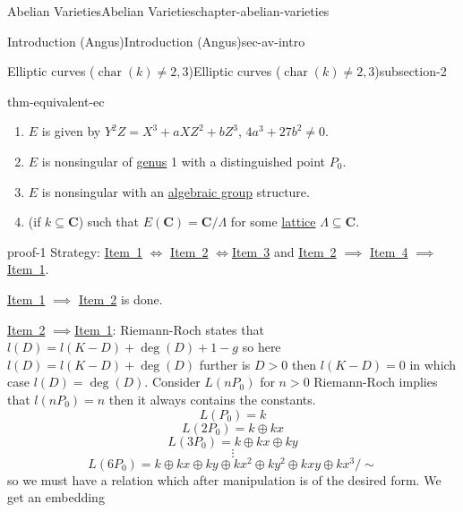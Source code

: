 \documentclass[oneside,10pt,]{book}
\numberwithin{equation}{section}
\newcommand{\CC}{\mathbf{C}}
\DeclareMathOperator{\characteristic}{char}
\newcommand{\gt}{>}
\begin{document}
\begin{chapterptx}{Abelian Varieties}{}{Abelian Varieties}{}{}{chapter-abelian-varieties}
\begin{sectionptx}{Introduction (Angus)}{}{Introduction (Angus)}{}{}{sec-av-intro}
\begin{subsectionptx}{Elliptic curves (\(\characteristic(k) \ne 2,3\))}{}{Elliptic curves (\(\characteristic(k) \ne 2,3\))}{}{}{subsection-2}
\begin{theorem}{}{}{thm-equivalent-ec}
\begin{enumerate}
\item\hypertarget{item-cubic-eq}{}\(E\) is given by \(Y^2Z = X^3 + aXZ^2 + bZ^3\), \(4a^3 + 27b^2 \ne 0\).%
\item\hypertarget{item-nonsing-pt}{}\(E\) is nonsingular of \hyperref[def-class-set]{genus} 1 with a distinguished point \(P_0\).%
\item\hypertarget{item-nonsing-gp}{}\(E\) is nonsingular with an \hyperref[def-alg-gp]{algebraic group} structure.%
\item\hypertarget{item-cmplx}{}(if \(k \subseteq \CC\)) such that \(E(\CC) = \CC/\Lambda\) for some \hyperref[def-buntes-lattice]{lattice} \(\Lambda \subseteq \CC\).%
\end{enumerate}
%
\end{theorem}
\begin{proofptx}{}{proof-1}
\hypertarget{p-14}{}%
Strategy: \hyperlink{item-cubic-eq}{Item~1} \(\iff\) \hyperlink{item-nonsing-pt}{Item~2} \(\iff\)\hyperlink{item-nonsing-gp}{Item~3} and \hyperlink{item-nonsing-pt}{Item~2} \(\implies\) \hyperlink{item-cmplx}{Item~4} \(\implies\) \hyperlink{item-cubic-eq}{Item~1}.%
\par
\hypertarget{p-15}{}%
\hyperlink{item-cubic-eq}{Item~1} \(\implies\) \hyperlink{item-nonsing-pt}{Item~2} is done.%
\par
\hypertarget{p-16}{}%
\hyperlink{item-nonsing-pt}{Item~2} \(\implies\)\hyperlink{item-cubic-eq}{Item~1}: Riemann-Roch states that \(l(D) = l(K-D) +  \deg(D) + 1 -g \) so here \(l(D) = l(K-D) + \deg (D)\) further is \(D\gt 0\) then \(l(K-D) = 0\) in which case \(l(D) = \deg(D)\). Consider \(L(nP_0)\) for \(n \gt 0\) Riemann-Roch implies that \(l(nP_0) = n\) then it always contains the constants.%
\begin{equation*}
L(P_0) = k
\end{equation*}
%
\begin{equation*}
L(2P_0) = k \oplus kx
\end{equation*}
%
\begin{equation*}
L(3P_0) = k \oplus kx \oplus ky
\end{equation*}
%
\begin{equation*}
\vdots
\end{equation*}
%
\begin{equation*}
L(6P_0) = k \oplus kx \oplus ky \oplus k x^2 \oplus ky^2 \oplus kxy \oplus kx^3/\sim
\end{equation*}
so we must have a relation which after manipulation is of the desired form. We get an embedding%

\end{proofptx}
\end{subsectionptx}
\end{sectionptx}
\end{chapterptx}
\end{document}
